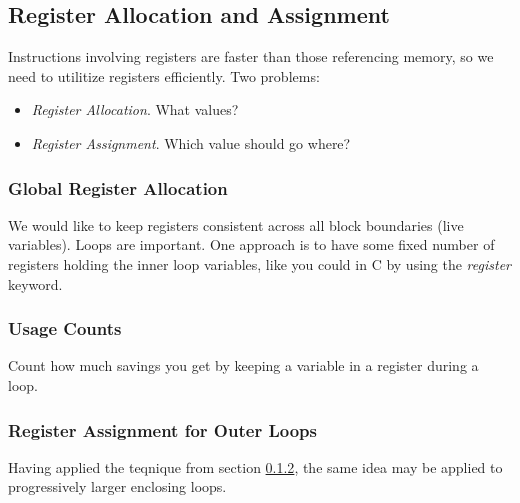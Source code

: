 \documentclass{article}
\begin{document}

\subsection{Register Allocation and Assignment} %
\label{sub:Register Allocation and Assignment}
Instructions involving registers are faster than those referencing memory, so we need to utilitize registers efficiently. Two problems:
\begin{itemize}
	\item \emph{Register Allocation}. What values?
	\item \emph{Register Assignment}. Which value should go where?
\end{itemize}

\subsubsection{Global Register Allocation} %
\label{ssub:Global Register Allocation}
We would like to keep registers consistent across all block boundaries (live variables). Loops are important. One approach is to have some fixed number of registers holding the inner loop variables, like you could in C by using the \emph{register} keyword.

\subsubsection{Usage Counts} %
\label{ssub:Usage Counts}
Count how much savings you get by keeping a variable in a register during a loop.

\subsubsection{Register Assignment for Outer Loops} %
\label{ssub:Register Assignment for Outer Loops}
Having applied the teqnique from section \ref{ssub:Usage Counts}, the same idea may be applied to progressively larger enclosing loops.
\end{document}
